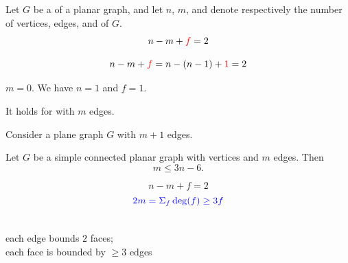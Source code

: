 \begin{frame}{}
  \begin{theorem}
    Let $G$ be a  of a  planar graph,
    and let $n$, $m$, and  denote respectively the number of vertices,
    edges, and  of $G$.
    \[
      n - m + \textcolor{red}{f} = 2
    \]
  \end{theorem}

  \pause
  \vspace{0.30cm}

  \pause
  \[
    n - m + \textcolor{red}{f} = n - (n - 1) + \textcolor{red}{1} = 2
  \]
\end{frame}

\begin{frame}{}
  \begin{center}

    \pause
    \vspace{0.30cm}
    \begin{description}
      \setlength{\itemsep}{8pt}
      \item[Basis Step:] $m = 0$. We have $n = 1$ and $f = 1$.
      \item[Induction Hypothesis:]
        It holds for  with $m$ edges.
      \item[Induction Step:] Consider a plane graph $G$ with $m+1$ edges. \\[5pt]
    \end{description}
  \end{center}
\end{frame}

\begin{frame}{}
  \begin{theorem}
    Let $G$ be a simple connected planar graph with
     vertices and $m$ edges. Then
    \[
      m \le 3n -6.
    \]
  \end{theorem}

  \pause
  \[
    n - m + f = 2
  \]
  \pause
  \[
    \textcolor{blue}{2m = \Sigma_{f} \deg(f) \ge 3f}
  \]
  \pause
  \begin{center}
     \\[3pt]
    each edge bounds $2$ faces; \\
    each face is bounded by $\ge 3$ edges
  \end{center}
\end{frame}

